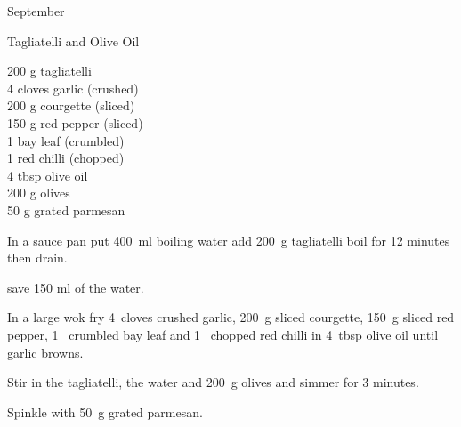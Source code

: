 \begin{menu}{September}
    \begin{recipe}{1}{Tagliatelli and Olive Oil}%
		\begin{ingredients}
		200 g tagliatelli  \\
	4 cloves garlic (crushed) \\
	200 g courgette (sliced) \\
	150 g red pepper (sliced) \\
	1  bay leaf (crumbled) \\
	1  red chilli (chopped) \\
	4 tbsp olive oil  \\
	200 g olives  \\
	50 g grated parmesan  \\
	
		\end{ingredients}
	
    \begin{instructions}
    \item 
      In a
      sauce pan
      put
      400~ml  boiling water
      add
      200~g  tagliatelli
      boil for 12 minutes then drain.
    
        save 150 ml of the water.
      \item 
        In a large wok fry
        4~cloves crushed garlic,
        200~g sliced courgette,
        150~g sliced red pepper,
        1~ crumbled bay leaf
        and
        1~ chopped red chilli
        in
        4~tbsp  olive oil
        until garlic browns.
      \item 
        Stir in the tagliatelli,
        the water
        and
        200~g  olives
        and simmer for 3 minutes.
      \item 
        Spinkle with
        50~g  grated parmesan.
      
    \end{instructions}
    \end{recipe}%
  
    \clearpage
    \end{menu}
	

